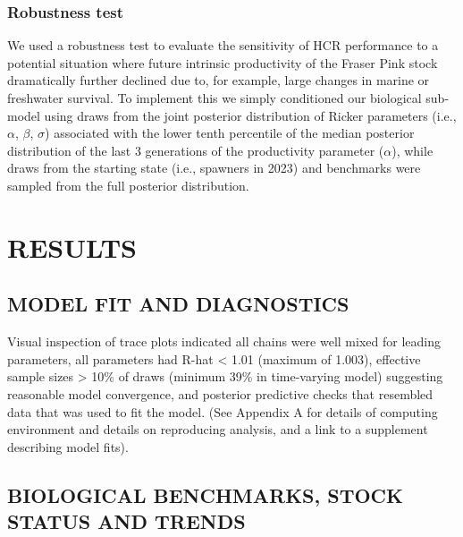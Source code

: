 \documentclass[11pt]{book}
\begin{document}
\hypertarget{robustness-test}{%
\subsubsection{Robustness test}\label{robustness-test}}

We used a robustness test to evaluate the sensitivity of HCR performance to a potential situation where future intrinsic productivity of the Fraser Pink stock dramatically further declined due to, for example, large changes in marine or freshwater survival. To implement this we simply conditioned our biological sub-model using draws from the joint posterior distribution of Ricker parameters (i.e., \(\alpha\), \(\beta\), \(\sigma\)) associated with the lower tenth percentile of the median posterior distribution of the last 3 generations of the productivity parameter (\(\alpha\)), while draws from the starting state (i.e., spawners in 2023) and benchmarks were sampled from the full posterior distribution.

\hypertarget{results}{%
\section{RESULTS}\label{results}}

\hypertarget{model-fit-and-diagnostics}{%
\subsection{MODEL FIT AND DIAGNOSTICS}\label{model-fit-and-diagnostics}}

Visual inspection of trace plots indicated all chains were well mixed for leading parameters, all parameters had R-hat \textless{} 1.01 (maximum of 1.003), effective sample sizes \textgreater{} 10\% of draws (minimum 39\% in time-varying model) suggesting reasonable model convergence, and posterior predictive checks that resembled data that was used to fit the model. (See Appendix A for details of computing environment and details on reproducing analysis, and a link to a supplement describing model fits).

\hypertarget{biological-benchmarks-stock-status-and-trends}{%
\subsection{BIOLOGICAL BENCHMARKS, STOCK STATUS AND TRENDS}\label{biological-benchmarks-stock-status-and-trends}}
\end{document}
